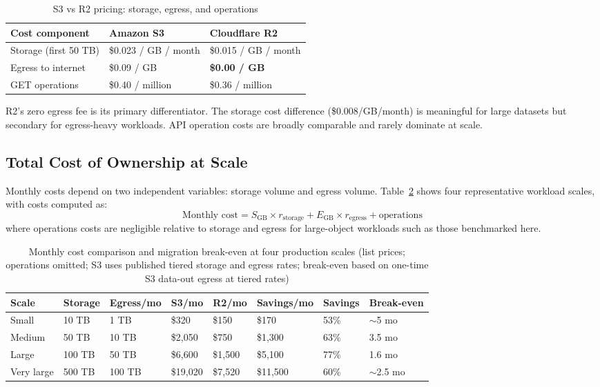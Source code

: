\begin{table}[H]
\centering
\caption{S3 vs R2 pricing: storage, egress, and operations}
\label{tab:pricing-comparison}
\begin{tabular}{p{3.6cm}p{3.8cm}p{3.8cm}}
\hline
\textbf{Cost component} & \textbf{Amazon S3} & \textbf{Cloudflare R2} \\
\hline
Storage (first 50 TB)  & \$0.023 / GB / month & \$0.015 / GB / month \\
Egress to internet     & \$0.09 / GB          & \textbf{\$0.00 / GB} \\
GET operations         & \$0.40 / million     & \$0.36 / million \\
\hline
\end{tabular}
\end{table}

R2's zero egress fee is its primary differentiator. The storage cost difference (\$0.008/GB/month) is meaningful for large datasets but secondary for egress-heavy workloads. API operation costs are broadly comparable and rarely dominate at scale.

\subsection{Total Cost of Ownership at Scale}

Monthly costs depend on two independent variables: storage volume and egress volume. Table~\ref{tab:cost-analysis} shows four representative workload scales, with costs computed as:
\[
\text{Monthly cost} = S_{\text{GB}} \times r_{\text{storage}} + E_{\text{GB}} \times r_{\text{egress}} + \text{operations}
\]
where operations costs are negligible relative to storage and egress for large-object workloads such as those benchmarked here.

\begin{table}[H]
\centering
\caption{Monthly cost comparison and migration break-even at four production scales (list prices; operations omitted; S3 uses published tiered storage and egress rates; break-even based on one-time S3 data-out egress at tiered rates)}
\label{tab:cost-analysis}
\small
\begin{tabular}{p{1.8cm}p{1.2cm}p{1.4cm}p{1.6cm}p{1.6cm}p{1.6cm}p{1.2cm}p{1.8cm}}
\hline
\textbf{Scale} & \textbf{Storage} & \textbf{Egress/mo} & \textbf{S3/mo} & \textbf{R2/mo} & \textbf{Savings/mo} & \textbf{Savings} & \textbf{Break-even} \\
\hline
Small      & 10 TB  & 1 TB   & \$320    & \$150   & \$170    & 53\% & $\sim$5 mo  \\
Medium     & 50 TB  & 10 TB  & \$2,050  & \$750   & \$1,300  & 63\% & 3.5 mo      \\
Large      & 100 TB & 50 TB  & \$6,600  & \$1,500 & \$5,100  & 77\% & 1.6 mo      \\
Very large & 500 TB & 100 TB & \$19,020 & \$7,520 & \$11,500 & 60\% & $\sim$2.5 mo\\
\hline
\end{tabular}
\end{table}

